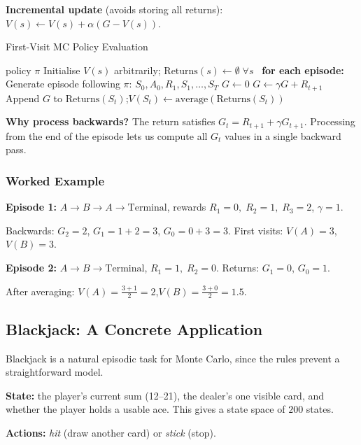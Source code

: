 \documentclass[11pt,a4paper]{article}
\begin{document}
\textbf{Incremental update} (avoids storing all returns):
$V(s) \leftarrow V(s) + \alpha(G - V(s))$.

\begin{algobox}[breakable]{First-Visit MC Policy Evaluation}
\begin{algorithmic}[1]
\Require policy $\pi$
\State Initialise $V(s)$ arbitrarily; $\text{Returns}(s) \leftarrow \emptyset\;\forall s$
\Loop\ \textbf{for each episode:}
  \State Generate episode following $\pi$: $S_0,A_0,R_1,S_1,\ldots,S_T$
  \State $G \leftarrow 0$
    \State $G \leftarrow \gamma G + R_{t+1}$
     
      \State Append $G$ to $\text{Returns}(S_t)$;\quad $V(S_t) \leftarrow \text{average}(\text{Returns}(S_t))$
    \EndIf
  \EndFor
\EndLoop
\end{algorithmic}
\textbf{Why process backwards?} The return satisfies $G_t = R_{t+1} + \gamma G_{t+1}$. Processing from the end of the episode lets us compute all $G_t$ values in a single backward pass.
\end{algobox}

\subsubsection{Worked Example}

\textbf{Episode 1:} $A \to B \to A \to \text{Terminal}$, rewards $R_1=0,\;R_2=1,\;R_3=2$, $\gamma=1$.

Backwards: $G_2=2$,\; $G_1=1+2=3$,\; $G_0=0+3=3$. First visits: $V(A)=3$,\; $V(B)=3$.

\textbf{Episode 2:} $A \to B \to \text{Terminal}$, $R_1=1,\;R_2=0$. Returns: $G_1=0$,\; $G_0=1$.

After averaging: $V(A) = \frac{3+1}{2} = 2$,\quad $V(B) = \frac{3+0}{2} = 1.5$.

\subsection{Blackjack: A Concrete Application}

Blackjack is a natural episodic task for Monte Carlo, since the rules prevent a straightforward model.

\textbf{State:} the player's current sum (12--21), the dealer's one visible card, and whether the player holds a usable ace. This gives a state space of $200$ states.

\textbf{Actions:} \textit{hit} (draw another card) or \textit{stick} (stop).
\end{document}
